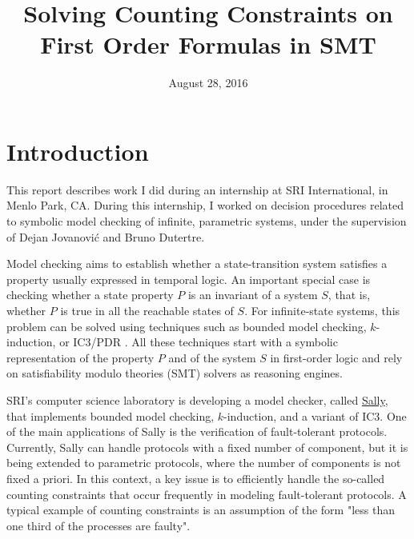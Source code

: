 \documentclass[]{article}
\title{Solving Counting Constraints on First Order Formulas in SMT}
\date{August 28, 2016}
\begin{document}
\maketitle

{
\setcounter{tocdepth}{3}
\tableofcontents
}

\newtheorem{definition}{Definition} \newtheorem{lemma}{Lemma}
\newtheorem{theorem}{Theorem} \newtheorem{property}{Property}
\newtheorem{example}{Example}

\newpage

\section*{Introduction}\label{introduction}


This report describes work I did during an internship at SRI
International, in Menlo Park, CA. During this internship, I
worked on decision procedures related to symbolic model checking
of infinite, parametric systems, under the supervision of
Dejan Jovanović and Bruno Dutertre. 

Model checking aims to establish whether a state-transition
system satisfies a property usually expressed in temporal logic.
An important special case is checking whether a state property
$P$ is an invariant of a system $S$, that is, whether $P$ is true in
all the reachable states of $S$. For infinite-state systems, this
problem can be solved using techniques such as bounded model
checking, $k$-induction, or IC3/PDR \cite{pdr}. All these techniques start with
a symbolic representation of the property $P$ and of the system $S$ in
first-order logic and rely on satisfiability modulo theories (SMT)
solvers as reasoning engines. 

SRI's computer science laboratory is developing a model checker,
called \href{http://sri-csl.github.io/sally/}{Sally}, that implements bounded model checking, $k$-induction,
and a variant of IC3.  One of the main applications of Sally is the
verification of fault-tolerant protocols. Currently, Sally can
handle protocols with a fixed number of component, but it is being
extended to parametric protocols, where the number of components is
not fixed a priori. In this context, a key issue is to efficiently
handle the so-called counting constraints that occur frequently in
modeling fault-tolerant protocols. A typical example of counting
constraints is an assumption of the form "less than one third of
the processes are faulty". 
\end{document}
